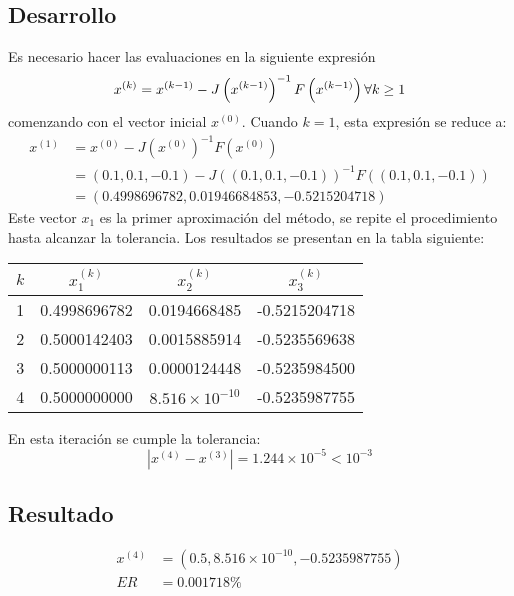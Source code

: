 \begin{exerciseT}
\subsection*{Desarrollo}
Es necesario hacer las evaluaciones en la siguiente expresión 
\[ 
	x^{(k)} = x^{(k-1)} - J\left(x^{(k-1)}\right)^{-1}F\left(x^{(k-1)} \right)\\
	\forall k\geq 1
\]
comenzando con el vector inicial $x^{(0)}$. Cuando $k=1$, esta expresión se reduce a:
\begin{align*}
	x^{(1)} &= x^{(0)} - J\left(x^{(0)}\right)^{-1}F\left(x^{(0)} \right)\\
		&= (0.1, 0.1, -0.1) - J\left((0.1, 0.1, -0.1)\right)^{-1}F\left((0.1, 0.1, -0.1) \right)\\
		&= (0.4998696782, 0.01946684853, -0.5215204718)
\end{align*}
Este vector $x_1$ es la primer aproximación del método, se repite el procedimiento hasta alcanzar la tolerancia.
Los resultados se presentan en la tabla siguiente:
\begin{table}[H]
	\centering
	\begin{tabular}{cccc}
		\toprule
		$k$ & $x_1^{(k)}$ & $x_2^{(k)}$ & $x_3^{(k)}$ \\
		\midrule
		1 & 0.4998696782 & 0.0194668485 & -0.5215204718 \\
		2 & 0.5000142403 & 0.0015885914 & -0.5235569638 \\
		3 & 0.5000000113 & 0.0000124448 & -0.5235984500 \\
		4 & 0.5000000000 & $8.516\times 10^{-10}$ & -0.5235987755\\
		\bottomrule	
	\end{tabular}
\end{table}
En esta iteración se cumple la tolerancia:
\[ |x^{(4)} - x^{(3)}| = 1.244\times 10^{-5} < 10^{-3}\]

\subsection*{Resultado}
\begin{align*}
	x^{(4)} &= (0.5, 8.516\times 10^{-10}, -0.5235987755) \\
	ER &= 0.001718\%
\end{align*}

\end{exerciseT}



